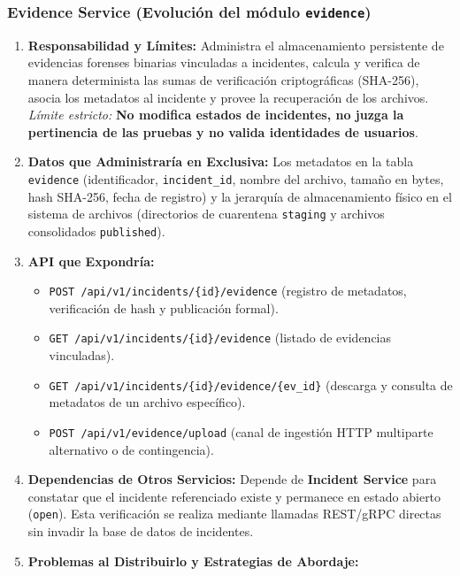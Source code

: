 \documentclass[10pt,a4paper]{article}
\begin{document}
\subsubsection{Evidence Service (Evolución del módulo \texttt{evidence})}

\begin{enumerate}[leftmargin=*]
    \item \textbf{Responsabilidad y Límites:} Administra el almacenamiento persistente de evidencias forenses binarias vinculadas a incidentes, calcula y verifica de manera determinista las sumas de verificación criptográficas (SHA-256), asocia los metadatos al incidente y provee la recuperación de los archivos. \textit{Límite estricto:} \textbf{No modifica estados de incidentes, no juzga la pertinencia de las pruebas y no valida identidades de usuarios}.
    \item \textbf{Datos que Administraría en Exclusiva:} Los metadatos en la tabla \texttt{evidence} (identificador, \texttt{incident\_id}, nombre del archivo, tamaño en bytes, hash SHA-256, fecha de registro) y la jerarquía de almacenamiento físico en el sistema de archivos (directorios de cuarentena \texttt{staging} y archivos consolidados \texttt{published}).
    \item \textbf{API que Expondría:}
    \begin{itemize}[leftmargin=*]
        \item \texttt{POST /api/v1/incidents/\{id\}/evidence} (registro de metadatos, verificación de hash y publicación formal).
        \item \texttt{GET /api/v1/incidents/\{id\}/evidence} (listado de evidencias vinculadas).
        \item \texttt{GET /api/v1/incidents/\{id\}/evidence/\{ev\_id\}} (descarga y consulta de metadatos de un archivo específico).
        \item \texttt{POST /api/v1/evidence/upload} (canal de ingestión HTTP multiparte alternativo o de contingencia).
    \end{itemize}
    \item \textbf{Dependencias de Otros Servicios:} Depende de \textbf{Incident Service} para constatar que el incidente referenciado existe y permanece en estado abierto (\texttt{open}). Esta verificación se realiza mediante llamadas REST/gRPC directas sin invadir la base de datos de incidentes.
    \item \textbf{Problemas al Distribuirlo y Estrategias de Abordaje:}

\end{enumerate}
\end{document}
